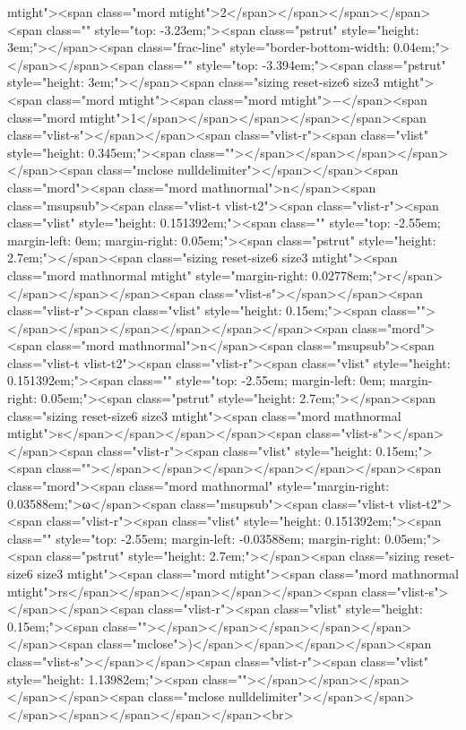 mtight"><span class="mord mtight">2</span></span></span></span><span class="" style="top: -3.23em;"><span class="pstrut" style="height: 3em;"></span><span class="frac-line" style="border-bottom-width: 0.04em;"></span></span><span class="" style="top: -3.394em;"><span class="pstrut" style="height: 3em;"></span><span class="sizing reset-size6 size3 mtight"><span class="mord mtight"><span class="mord mtight">−</span><span class="mord mtight">1</span></span></span></span></span><span class="vlist-s">​</span></span><span class="vlist-r"><span class="vlist" style="height: 0.345em;"><span class=""></span></span></span></span></span><span class="mclose nulldelimiter"></span></span><span class="mord"><span class="mord mathnormal">n</span><span class="msupsub"><span class="vlist-t vlist-t2"><span class="vlist-r"><span class="vlist" style="height: 0.151392em;"><span class="" style="top: -2.55em; margin-left: 0em; margin-right: 0.05em;"><span class="pstrut" style="height: 2.7em;"></span><span class="sizing reset-size6 size3 mtight"><span class="mord mathnormal mtight" style="margin-right: 0.02778em;">r</span></span></span></span><span class="vlist-s">​</span></span><span class="vlist-r"><span class="vlist" style="height: 0.15em;"><span class=""></span></span></span></span></span></span><span class="mord"><span class="mord mathnormal">n</span><span class="msupsub"><span class="vlist-t vlist-t2"><span class="vlist-r"><span class="vlist" style="height: 0.151392em;"><span class="" style="top: -2.55em; margin-left: 0em; margin-right: 0.05em;"><span class="pstrut" style="height: 2.7em;"></span><span class="sizing reset-size6 size3 mtight"><span class="mord mathnormal mtight">s</span></span></span></span><span class="vlist-s">​</span></span><span class="vlist-r"><span class="vlist" style="height: 0.15em;"><span class=""></span></span></span></span></span></span><span class="mord"><span class="mord mathnormal" style="margin-right: 0.03588em;">ω</span><span class="msupsub"><span class="vlist-t vlist-t2"><span class="vlist-r"><span class="vlist" style="height: 0.151392em;"><span class="" style="top: -2.55em; margin-left: -0.03588em; margin-right: 0.05em;"><span class="pstrut" style="height: 2.7em;"></span><span class="sizing reset-size6 size3 mtight"><span class="mord mtight"><span class="mord mathnormal mtight">rs</span></span></span></span></span><span class="vlist-s">​</span></span><span class="vlist-r"><span class="vlist" style="height: 0.15em;"><span class=""></span></span></span></span></span></span><span class="mclose">)</span></span></span></span><span class="vlist-s">​</span></span><span class="vlist-r"><span class="vlist" style="height: 1.13982em;"><span class=""></span></span></span></span></span><span class="mclose nulldelimiter"></span></span></span></span></span></span></span><br>
